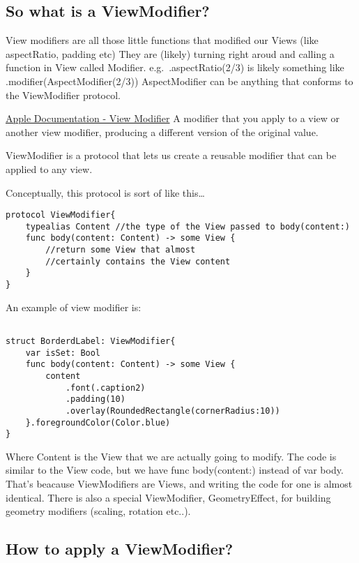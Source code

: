 \documentclass[]{article}
\begin{document}
\hypertarget{so-what-is-a-viewmodifier}{%
\subsection{So what is a
ViewModifier?}\label{so-what-is-a-viewmodifier}}

View modifiers are all those little functions that modified our Views
(like aspectRatio, padding etc) They are (likely) turning right aroud
and calling a function in View called Modifier. e.g.~.aspectRatio(2/3)
is likely something like .modifier(AspectModifier(2/3)) AspectModifier
can be anything that conforms to the ViewModifier protocol.

\href{https://developer.apple.com/documentation/swiftui/viewmodifier}{Apple
Documentation - View Modifier} A modifier that you apply to a view or
another view modifier, producing a different version of the original
value.

ViewModifier is a protocol that lets us create a reusable modifier that
can be applied to any view.

Conceptually, this protocol is sort of like this\ldots{}

\begin{verbatim}
protocol ViewModifier{
    typealias Content //the type of the View passed to body(content:)
    func body(content: Content) -> some View {
        //return some View that almost 
        //certainly contains the View content
    }
}
\end{verbatim}

An example of view modifier is:

\begin{verbatim}

struct BorderdLabel: ViewModifier{
    var isSet: Bool
    func body(content: Content) -> some View {
        content
            .font(.caption2)
            .padding(10)
            .overlay(RoundedRectangle(cornerRadius:10))
    }.foregroundColor(Color.blue)
}
\end{verbatim}

Where Content is the View that we are actually going to modify. The code
is similar to the View code, but we have func body(content:) instead of
var body. That's beacause ViewModifiers are Views, and writing the code
for one is almost identical. There is also a special ViewModifier,
GeometryEffect, for building geometry modifiers (scaling, rotation
etc..).

\hypertarget{how-to-apply-a-viewmodifier}{%
\subsection{How to apply a
ViewModifier?}\label{how-to-apply-a-viewmodifier}}
\end{document}
